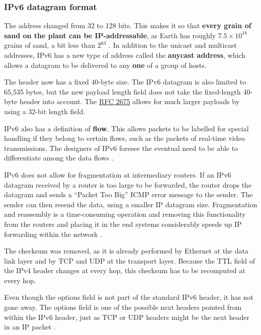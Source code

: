 \subsubsection{IPv6 datagram format}

The address changed from 32 to 128 bits.
This makes it so that \textbf{every grain of sand on the plant can be IP-addressable}, as Earth has roughly \(7.5 \times 10^{18}\) grains of sand, a bit less than \(2^{63}\) \cite{computer-networking-kurose-2012}.
In addition to the unicast and multicast addresses, IPv6 has a new type of address called the \textbf{anycast address}, which allows a datagram to be delivered to any \textbf{one} of a group of hosts.

The header now has a fixed 40-byte size.
The IPv6 datagram is also limited to 65,535 bytes, but the new payload length field does not take the fixed-length 40-byte header into account.
The \href{https://tools.ietf.org/html/rfc2675}{RFC 2675} allows for much larger payloads by using a 32-bit length field.

IPv6 also has a definition of \textbf{flow}. This allows packets to be labelled for special handling if they belong to certain flows, such as the packets of real-time video transmissions.
The designers of IPv6 foresee the eventual need to be able to differentiate among the data flows \cite{computer-networking-kurose-2012}.

IPv6 does not allow for fragmentation at intermediary routers.
If an IPv6 datagram received by a router is too large to be forwarded, the router drops the datagram and sends a ``Packet Too Big'' ICMP error message to the sender.
The sender can then resend the data, using a smaller IP datagram size.
Fragmentation and reassembly is a time-consuming operation and removing this functionality from the routers and placing it in the end systems considerably speeds up IP forwarding within the network \cite[p.~358]{computer-networking-kurose-2012}.

The checksum was removed, as it is already performed by Ethernet at the data link layer and by TCP and UDP at the transport layer.
Because the TTL field of the IPv4 header changes at every hop, this checksum has to be recomputed at every hop.

Even though the options field is not part of the standard IPv6 header, it has not gone away.
The options field is one of the possible next headers pointed from within the IPv6 header, just as TCP or UDP headers might be the next header in an IP packet \cite[p.~359]{computer-networking-kurose-2012}.

